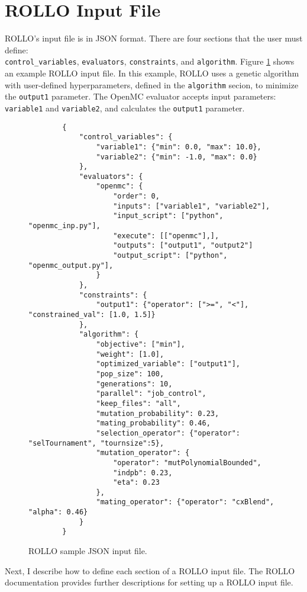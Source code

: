 \section{ROLLO Input File}
\label{sec:rollo-input-file}
\gls{ROLLO}'s input file is in JSON format. 
There are four sections that the user must define: \\ \texttt{control\_variables}, 
\texttt{evaluators}, \texttt{constraints}, and \texttt{algorithm}. 
Figure \ref{fig:rollo-input} shows an example \gls{ROLLO} input file. 
In this example, \gls{ROLLO} uses a genetic algorithm with user-defined 
hyperparameters, defined in the \texttt{algorithm} secion, to minimize the 
\texttt{output1} parameter.
The OpenMC evaluator accepts input parameters: \texttt{variable1} and 
\texttt{variable2}, and calculates the \texttt{output1} parameter.
\begin{figure}[htbp]
    \begin{verbatim}
        {
            "control_variables": {
                "variable1": {"min": 0.0, "max": 10.0}, 
                "variable2": {"min": -1.0, "max": 0.0}
            }, 
            "evaluators": {
                "openmc": {
                    "order": 0,
                    "inputs": ["variable1", "variable2"],
                    "input_script": ["python", "openmc_inp.py"],
                    "execute": [["openmc"],],
                    "outputs": ["output1", "output2"]
                    "output_script": ["python", "openmc_output.py"], 
                }
            }, 
            "constraints": {
                "output1": {"operator": [">=", "<"], "constrained_val": [1.0, 1.5]}
            }, 
            "algorithm": {
                "objective": ["min"], 
                "weight": [1.0],
                "optimized_variable": ["output1"], 
                "pop_size": 100, 
                "generations": 10, 
                "parallel": "job_control",
                "keep_files": "all",
                "mutation_probability": 0.23,
                "mating_probability": 0.46,
                "selection_operator": {"operator": "selTournament", "tournsize":5},
                "mutation_operator": {
                    "operator": "mutPolynomialBounded",
                    "indpb": 0.23,
                    "eta": 0.23
                },
                "mating_operator": {"operator": "cxBlend", "alpha": 0.46}
            }
        }
    \end{verbatim}
    \caption{\acrfull{ROLLO} sample JSON input file.}
    \label{fig:rollo-input}
\end{figure}
Next, I describe how to define each section of a \gls{ROLLO} input file. 
The \gls{ROLLO} documentation \cite{chee_documentation_2021} provides further 
descriptions for setting up a \gls{ROLLO} input file.

